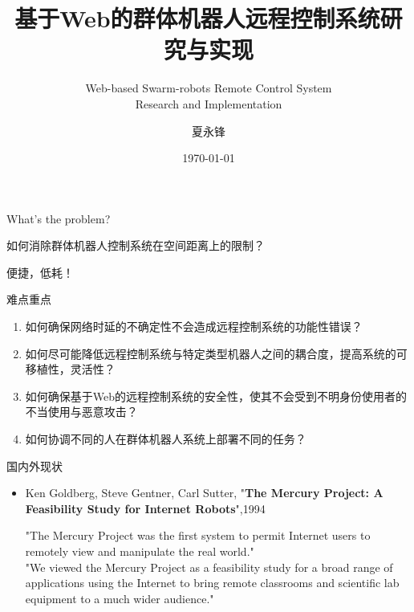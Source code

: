 \documentclass[CJK]{beamer}
\begin{document}
\begin{CJK*}{UTF8}{gkai}

\title{基于Web的群体机器人远程控制系统研究与实现}
\subtitle{\small Web-based Swarm-robots Remote Control System\\Research and Implementation}
\author{夏永锋}
\date{\today}

\begin{frame}
	\titlepage
\end{frame}

\begin{frame}{What's the problem?}
\begin{alertblock}{}
\begin{center}
{\Large
如何消除群体机器人控制系统在空间距离上的限制？
}
\end{center}
\end{alertblock}
\begin{block}{}
\begin{center}
便捷，低耗！
\end{center}
\end{block}
\end{frame}
\begin{frame}{难点重点}
\begin{enumerate}
	\item<2-> 如何确保网络时延的不确定性不会造成远程控制系统的功能性错误？
	\item<3-> 如何尽可能降低远程控制系统与特定类型机器人之间的耦合度，提高系统的可移植性，灵活性？
	\item<4-> 如何确保基于Web的远程控制系统的安全性，使其不会受到不明身份使用者的不当使用与恶意攻击？
	\item<5-> 如何协调不同的人在群体机器人系统上部署不同的任务？
\end{enumerate}
\end{frame}
\begin{frame}{国内外现状}
\begin{itemize}
	\item Ken Goldberg, Steve Gentner, Carl Sutter, "{\bf The Mercury Project: A Feasibility Study for Internet Robots}",1994
	\begin{block}{}
	"The Mercury Project was the first system to permit Internet users to remotely view and manipulate the real world."\\
	"We viewed the Mercury Project as a feasibility study for a broad range of applications using the Internet to bring remote classrooms and scientific lab equipment to a much wider audience."

\end{block}
\end{itemize}
\end{frame}
\end{CJK*}
\end{document}
